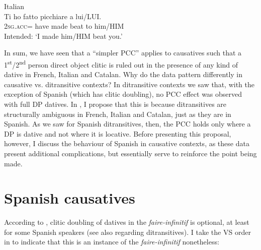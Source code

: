 \documentclass[output=paper,colorlinks,citecolor=brown,nonflat]{langsci/langscibook}
\begin{document}
\ea%
    \label{ex:sheehan:28}
    Italian\footnotemark{}\\
    \gll    *Ti ho        fatto   picchiare   a    lui/LUI.\\
            2\textsc{sg.acc}= have   made   beat     to him/HIM\\
    \glt    Intended: ‘I made him/HIM beat you.’
\z
{}

In sum, we have seen that a ``simpler PCC'' applies to causatives such that a 1\textsuperscript{st}/2\textsuperscript{nd} person direct object clitic is ruled out in the presence of any kind of dative in French, Italian and Catalan. Why do the data pattern differently in causative vs. ditransitive contexts? In ditransitive contexts we saw that, with the exception of Spanish (which has clitic doubling), no PCC effect was observed with full DP datives. In , I propose that this is because ditransitives are structurally ambiguous in French, Italian and Catalan, just as they are in Spanish. As we saw for Spanish ditransitives, then, the PCC holds only where a DP is dative and not where it is locative. Before presenting this proposal, however, I discuss the behaviour of Spanish in causative contexts, as these data present additional complications, but essentially serve to reinforce the point being made.

\section{Spanish causatives}\label{sec:sheehan:4}

According to \citet{Torrego2010}, clitic doubling of datives in the \textit{faire-infinitif} is optional, at least for some Spanish speakers (see also \citealt{Pineda2013, Pineda2020} regarding ditransitives). I take the VS order in  to indicate that this is an instance of the \textit{faire-infinitif} nonetheless:
\end{document}

